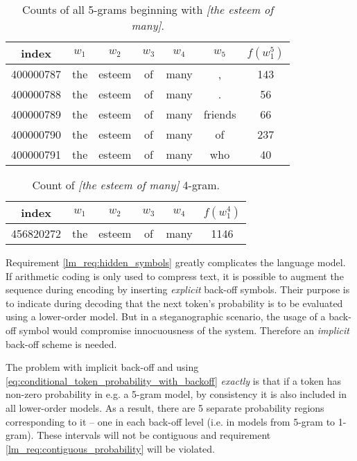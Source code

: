 \documentclass[draft]{IIBproject}
\makeatletter
\DeclareRobustCommand*{\eg}{e.g.\@\xspace}
\DeclareRobustCommand*{\ie}{i.e.\@\xspace}
\DeclareRobustCommand{\ngram}[1]{\emph{[#1]}}
\makeatother
\begin{document}
\begin{table}[h]
	\centering
	\begin{tabular}{c | *{5}{| c} || c}
	index & $w_1$ & $w_2$ & $w_3$ & $w_4$ & $w_5$ & $f(w_1^5)$ \\
	\hline
	\num{400000787} & the & esteem & of & many & , & 143 \\
	\num{400000788} & the & esteem & of & many & . & 56 \\
	\num{400000789} & the & esteem & of & many & friends & 66 \\
	\num{400000790} & the & esteem & of & many & of & 237 \\
	\num{400000791} & the & esteem & of & many & who & 40
	\end{tabular}
	\caption{\label{tab:the_esteem_of_many_CONT}Counts of all 5-grams beginning with \ngram{the esteem of many}.}
\end{table}

\begin{table}[h]
	\centering
	\begin{tabular}{c | *{4}{| c} || c}
	index & $w_1$ & $w_2$ & $w_3$ & $w_4$ & $f(w_1^4)$ \\
	\hline
	\num{456820272} & the & esteem & of & many & 1146
	\end{tabular}
	\caption{\label{tab:the_esteem_of_many}Count of \ngram{the esteem of many} 4-gram.}
\end{table}

Requirement \ref{lm_req:hidden_symbols} greatly complicates the language model. If arithmetic coding is only used to compress text, it is possible to augment the sequence during encoding by inserting \emph{explicit} back-off symbols. Their purpose is to indicate during decoding that the next token's probability is to be evaluated using a lower-order model. But in a steganographic scenario, the usage of a back-off symbol would compromise innocuousness of the system. Therefore an \emph{implicit} back-off scheme is needed.

The problem with implicit back-off and using \cref{eq:conditional_token_probability_with_backoff} \emph{exactly} is that if a token has non-zero probability in \eg a 5-gram model, by consistency it is also included in all lower-order models. As a result, there are 5 separate probability regions corresponding to it -- one in each back-off level (\ie in models from 5-gram to 1-gram). These intervals will not be contiguous and requirement \ref{lm_req:contiguous_probability} will be violated.

\FloatBarrier
\end{document}
